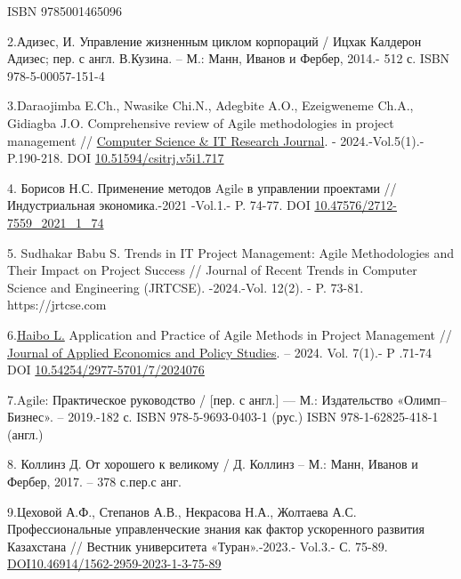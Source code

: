 ISBN 9785001465096

2.Адизес, И. Управление жизненным циклом корпораций / Ицхак Калдерон
Адизес; пер. с англ. В.Кузина. -- М.: Манн, Иванов и Фербер, 2014.- 512
с. ISBN 978-5-00057-151-4

3.Daraojimba E.Ch., Nwasike Chi.N., Adegbite A.O., Ezeigweneme Ch.A.,
Gidiagba J.O. Comprehensive review of Agile methodologies in project
management //
\href{https://www.researchgate.net/journal/Computer-Science-IT-Research-Journal-2709-0051?_tp=eyJjb250ZXh0Ijp7ImZpcnN0UGFnZSI6Il9kaXJlY3QiLCJwYWdlIjoicHVibGljYXRpb24iLCJwcmV2aW91c1BhZ2UiOiJfZGlyZWN0In19}{Computer
Science \& IT Research Journal}. - 2024.-Vol.5(1).- P.190-218. DOI
\href{http://dx.doi.org/10.51594/csitrj.v5i1.717}{10.51594/csitrj.v5i1.717}

4. Борисов Н.С. Применение методов Agile в управлении проектами //
Индустриальная экономика.-2021 -Vol.1.- P. 74-77. DOI
\href{https://doi.org/10.47576/2712-7559_2021_1_74}{10.47576/2712-7559\_2021\_1\_74}

5. Sudhakar Babu S. Trends in IT Project Management: Agile Methodologies
and Their Impact on Project Success // Journal of Recent Trends in
Computer Science and Engineering (JRTCSE). -2024.-Vol. 12(2). - P.
73-81. https://jrtcse.com

6.\href{https://www.researchgate.net/scientific-contributions/Haibo-Li-2290691805?_tp=eyJjb250ZXh0Ijp7ImZpcnN0UGFnZSI6Il9kaXJlY3QiLCJwYWdlIjoicHVibGljYXRpb24iLCJwcmV2aW91c1BhZ2UiOiJfZGlyZWN0In19}{Haibo
L.} Application and Practice of Agile Methods in Project Management //
\href{https://www.researchgate.net/journal/Journal-of-Applied-Economics-and-Policy-Studies-2977-571X?_tp=eyJjb250ZXh0Ijp7ImZpcnN0UGFnZSI6Il9kaXJlY3QiLCJwYWdlIjoicHVibGljYXRpb24iLCJwcmV2aW91c1BhZ2UiOiJfZGlyZWN0In19}{Journal
of Applied Economics and Policy Studies}. -- 2024. Vol. 7(1).- P .71-74
DOI
\href{http://dx.doi.org/10.54254/2977-5701/7/2024076}{10.54254/2977-5701/7/2024076}

7.Agile: Практическое руководство / {[}пер. с англ.{]} --- М.:
Издательство «Олимп--Бизнес». -- 2019.-182 с. ISBN 978-5-9693-0403-1
(рус.) ISBN 978-1-62825-418-1 (англ.)

8. Коллинз Д. От хорошего к великому / Д. Коллинз -- М.: Манн, Иванов и
Фербер, 2017. -- 378 с.пер.с анг.

9.Цеховой А.Ф., Степанов А.В., Некрасова Н.А., Жолтаева А.С.
Профессиональные управленческие знания как фактор ускоренного развития
Казахстана // Вестник университета «Туран».-2023.- Vol.3.- С. 75-89.
\href{https://doi.org/10.46914/1562-2959-2023-1-3-75-89}{DOI10.46914/1562-2959-2023-1-3-75-89}

